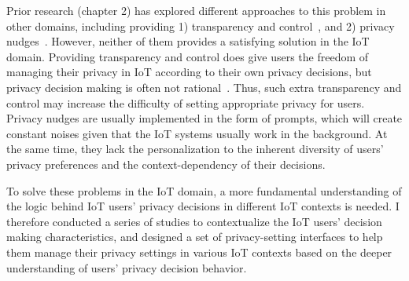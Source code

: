 Prior research (chapter 2) has explored different approaches to this problem in other domains, including providing 1) transparency and control~\cite{egelman2009timing,acquisti2006imagined,knijnenburg2015user,benisch2011capturing,brodie2004personalization}, and 2) privacy nudges~\cite{almuhimedi2015your,liu2016follow,fu2014field,liu2016follow}. However, neither of them provides a satisfying solution in the IoT domain. Providing transparency and control does give users the freedom of managing their privacy in IoT according to their own privacy decisions, but privacy decision making is often not rational~\cite{knijnenburg2015user}. Thus, such extra transparency and control may increase the difficulty of setting appropriate privacy for users. Privacy nudges are usually implemented in the form of prompts, which will create constant noises given that the IoT systems usually work in the background. At the same time, they lack the personalization to the inherent diversity of users’ privacy preferences and the context-dependency of their decisions.

To solve these problems in the IoT domain, a more fundamental understanding of the logic behind IoT users' privacy decisions in different IoT contexts is needed. I therefore conducted a series of studies to contextualize the IoT users' decision making characteristics, and designed a set of privacy-setting interfaces to help them manage their privacy settings in various IoT contexts based on the deeper understanding of users' privacy decision behavior. 


